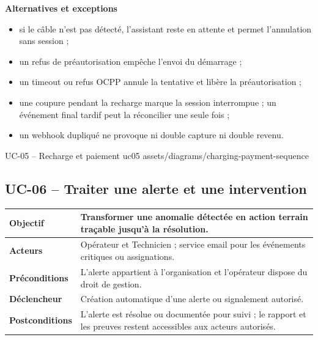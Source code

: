 \textbf{Alternatives et exceptions}
\begin{itemize}[leftmargin=7mm]
  \item si le câble n'est pas détecté, l'assistant reste en attente et permet
  l'annulation sans session ;
  \item un refus de préautorisation empêche l'envoi du démarrage ;
  \item un timeout ou refus OCPP annule la tentative et libère la préautorisation ;
  \item une coupure pendant la recharge marque la session interrompue ; un événement
  final tardif peut la réconcilier une seule fois ;
  \item un webhook dupliqué ne provoque ni double capture ni double revenu.
\end{itemize}

\UseCaseUmlPlate
  {UC-05 -- Recharge et paiement}
  {uc05}
  {assets/diagrams/charging-payment-sequence}

\subsection{UC-06 -- Traiter une alerte et une intervention}

\begin{table}[H]
  \centering
  \begin{tabularx}{\textwidth}{|C{3.3cm}|Y|}
    \hline
    \textbf{Objectif} & Transformer une anomalie détectée en action terrain traçable
    jusqu'à la résolution.\\\hline
    \textbf{Acteurs} & Opérateur et Technicien ; service email pour les événements
    critiques ou assignations.\\\hline
    \textbf{Préconditions} & L'alerte appartient à l'organisation et l'opérateur
    dispose du droit de gestion.\\\hline
    \textbf{Déclencheur} & Création automatique d'une alerte ou signalement autorisé.\\\hline
    \textbf{Postconditions} & L'alerte est résolue ou documentée pour suivi ; le
    rapport et les preuves restent accessibles aux acteurs autorisés.\\\hline

  \end{tabularx}
\end{table}

